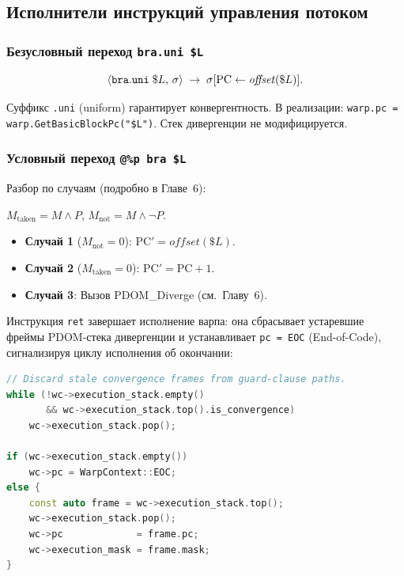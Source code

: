 \subsection{Исполнители инструкций управления потоком}

\subsubsection{Безусловный переход \texttt{bra.uni \$L}}

\begin{equation}
  \langle \mathtt{bra.uni}\;\$L,\, \sigma \rangle
  \;\rightarrow\; \sigma[\mathrm{PC} \leftarrow \mathit{offset}(\$L)].
\end{equation}

Суффикс \texttt{.uni} (uniform) гарантирует конвергентность.
В реализации: \texttt{warp.pc = warp.GetBasicBlockPc("\$L")}.
Стек дивергенции не модифицируется.

\subsubsection{Условный переход \texttt{@\%p bra \$L}}

Разбор по случаям (подробно в Главе~6):

$M_{\mathrm{taken}} = M \wedge P$, $M_{\mathrm{not}} = M \wedge \neg P$.

\begin{itemize}
  \item \textbf{Случай 1} ($M_{\mathrm{not}} = 0$):
        $\mathrm{PC}' = \mathit{offset}(\$L)$.
  \item \textbf{Случай 2} ($M_{\mathrm{taken}} = 0$):
        $\mathrm{PC}' = \mathrm{PC} + 1$.
  \item \textbf{Случай 3}: Вызов PDOM\_Diverge (см.~Главу~6).
\end{itemize}

Инструкция \texttt{ret} завершает исполнение варпа: она сбрасывает
устаревшие фреймы PDOM-стека дивергенции и устанавливает
\texttt{pc = EOC} (End-of-Code), сигнализируя циклу исполнения
об окончании:

\begin{lstlisting}[language=C++, caption={retInstruction::ExecuteBranch (executors.tpp)}]
// Discard stale convergence frames from guard-clause paths.
while (!wc->execution_stack.empty()
       && wc->execution_stack.top().is_convergence)
    wc->execution_stack.pop();

if (wc->execution_stack.empty())
    wc->pc = WarpContext::EOC;
else {
    const auto frame = wc->execution_stack.top();
    wc->execution_stack.pop();
    wc->pc             = frame.pc;
    wc->execution_mask = frame.mask;
}
\end{lstlisting}


